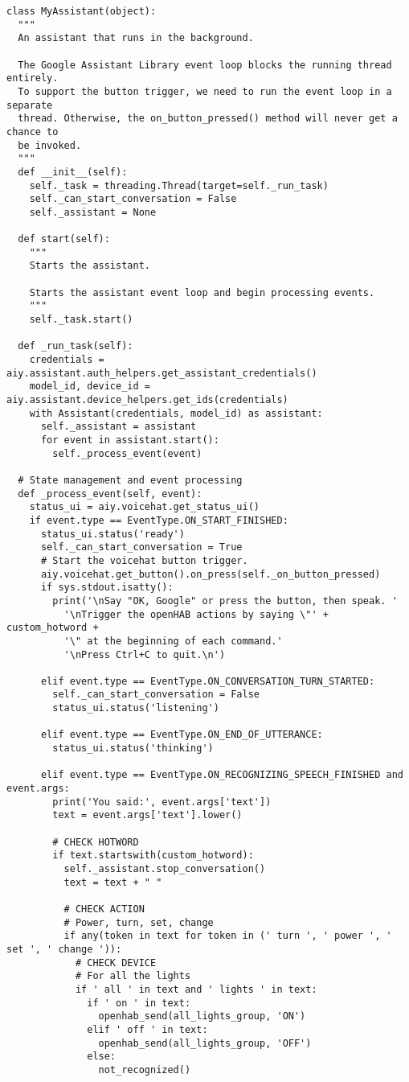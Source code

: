 \begin{lstlisting}[style=PythonCode]
class MyAssistant(object):
  """
  An assistant that runs in the background.

  The Google Assistant Library event loop blocks the running thread entirely.
  To support the button trigger, we need to run the event loop in a separate
  thread. Otherwise, the on_button_pressed() method will never get a chance to
  be invoked.
  """
  def __init__(self):
    self._task = threading.Thread(target=self._run_task)
    self._can_start_conversation = False
    self._assistant = None

  def start(self):
    """
    Starts the assistant.

    Starts the assistant event loop and begin processing events.
    """
    self._task.start()

  def _run_task(self):
    credentials = aiy.assistant.auth_helpers.get_assistant_credentials()
    model_id, device_id = aiy.assistant.device_helpers.get_ids(credentials)
    with Assistant(credentials, model_id) as assistant:
      self._assistant = assistant
      for event in assistant.start():
        self._process_event(event)

  # State management and event processing
  def _process_event(self, event):
    status_ui = aiy.voicehat.get_status_ui()
    if event.type == EventType.ON_START_FINISHED:
      status_ui.status('ready')
      self._can_start_conversation = True
      # Start the voicehat button trigger.
      aiy.voicehat.get_button().on_press(self._on_button_pressed)
      if sys.stdout.isatty():
        print('\nSay "OK, Google" or press the button, then speak. '
          '\nTrigger the openHAB actions by saying \"' + custom_hotword +
          '\" at the beginning of each command.'
          '\nPress Ctrl+C to quit.\n')

      elif event.type == EventType.ON_CONVERSATION_TURN_STARTED:
        self._can_start_conversation = False
        status_ui.status('listening')

      elif event.type == EventType.ON_END_OF_UTTERANCE:
        status_ui.status('thinking')

      elif event.type == EventType.ON_RECOGNIZING_SPEECH_FINISHED and event.args:
        print('You said:', event.args['text'])
        text = event.args['text'].lower()

        # CHECK HOTWORD
        if text.startswith(custom_hotword):
          self._assistant.stop_conversation()
          text = text + " "

          # CHECK ACTION
          # Power, turn, set, change
          if any(token in text for token in (' turn ', ' power ', ' set ', ' change ')):
            # CHECK DEVICE
            # For all the lights
            if ' all ' in text and ' lights ' in text:
              if ' on ' in text:
                openhab_send(all_lights_group, 'ON')
              elif ' off ' in text:
                openhab_send(all_lights_group, 'OFF')
              else:
                not_recognized()


\end{lstlisting}
